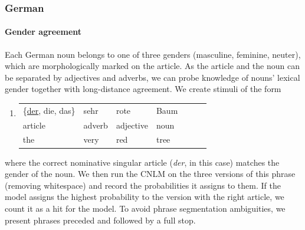 \subsubsection{German}%


\paragraph{Gender agreement}
Each German noun belongs to one of three genders (masculine, feminine, neuter), which are morphologically marked on the article. As the article and the noun can be separated by adjectives and adverbs, we can probe knowledge of nouns' lexical gender together with long-distance agreement.
We create stimuli of the form
\begin{enumerate}[label={(\arabic*)}]
	\item \begin{tabular}[t]{lllllll}
	\{\underline{der}, die, das\}& sehr& rote& Baum \\
	article & adverb & adjective & noun \\
	the & very & red & tree
\end{tabular}
\end{enumerate}
where the correct nominative singular article (\emph{der}, in this case) matches the gender of the noun.
We then run the CNLM on the three versions of this phrase (removing whitespace) and record the probabilities it assigns to them. If the model assigns the highest probability to the version with the right article, we count it as a hit for the model. To avoid phrase segmentation ambiguities, we present phrases preceded and followed by a full stop.


